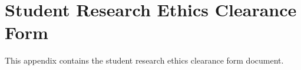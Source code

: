 %
%
%                 

\chapter{Student Research Ethics Clearance Form}
\label{sec:appendixe}

This appendix contains the student research ethics clearance form document. 



